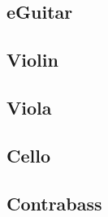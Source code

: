\begin{center}
\pagebreak

\subsection{eGuitar}
\begin{center}
 
\end{center}

\pagebreak

\subsection{Violin}
\begin{center}
 
\end{center}

\pagebreak

\subsection{Viola}
\begin{center}
 
\end{center}

\pagebreak

\subsection{Cello}
\begin{center}
 
\end{center}

\pagebreak

\subsection{Contrabass}
\begin{center}
 
\end{center}



\end{center}




